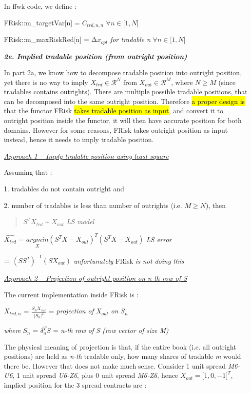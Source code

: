 In ffwk code, we define :

FRisk::m\_targetVar{[}n{]} = \(C_{trd,n,n}\)
\(\forall n \in \lbrack 1,N\rbrack\)

FRisk::m\_maxRiskRed{[}n{]} = \({\mathrm{\Delta}x}_{opt}\) \emph{for
tradable n} \(\forall n \in \lbrack 1,N\rbrack\)

\emph{\textbf{2e. Implied tradable position (from outright position)}}

In part 2a, we know how to decompose tradable position into outright
position, yet there is no way to imply \(X_{trd} \in \mathcal{R}^{N}\)
from \(X_{out} \in \mathcal{R}^{M}\), where \(N \geq M\) (since
tradables contains outrights). There are multiple possible tradable
positions, that can be decomposed into the same outright position.
Therefore \hl{a proper design is} that the functor FRisk \hl{takes
tradable position as input}, and convert it to outright position inside
the functor, it will then have accurate position for both domains.
However for some reasons, FRisk takes outright position as input
instead, hence it needs to imply tradable position.

\emph{\ul{Approach 1 -- Imply tradable position using least square}}

Assuming that :

1. tradables do not contain outright and

2. number of tradables is less than number of outrights (i.e.
\(M \geq N\)), then

\begin{quote}
\(S^{T}X_{trd}\) \textasciitilde{} \(X_{out}\) \emph{LS model}
\end{quote}

\(\widehat{X_{trd}}\) =
\(\underset{X}{argmin}{{(S^{T}X - X_{out})}^{T}(S^{T}X - X_{out})}\)
\emph{LS error}

\textbf{=} \({({SS}^{T})}^{- 1}(SX_{out})\) \emph{unfortunately} FRisk
\emph{is not doing this}

\emph{\ul{Approach 2 -- Projection of outright position on n-th row of
S}}

The current implementation inside FRisk is :

\(X_{trd,n}\) = \(\frac{S_{n}X_{out}}{\left| S_{n} \right|^{2}}\) =
\emph{projection of} \(X_{out}\) \emph{on} \(S_{n}\)

\emph{where} \(S_{n}\) = \(\delta_{n}^{T}S\) = \emph{n-th row of S (row
vector of size M)}

The physical meaning of projection is that, if the entire book (i.e. all
outright positions) are held as \emph{n-th} tradable only, how many
shares of tradable \emph{m} would there be. However that does not make
much sense. Consider 1 unit spread \emph{M6-U6}, 1 unit spread
\emph{U6-Z6}, plus 0 unit spread \emph{M6-Z6}, hence
\(X_{out} = {\lbrack 1,0, - 1\rbrack}^{T}\), implied position for the 3
spread contracts are :

